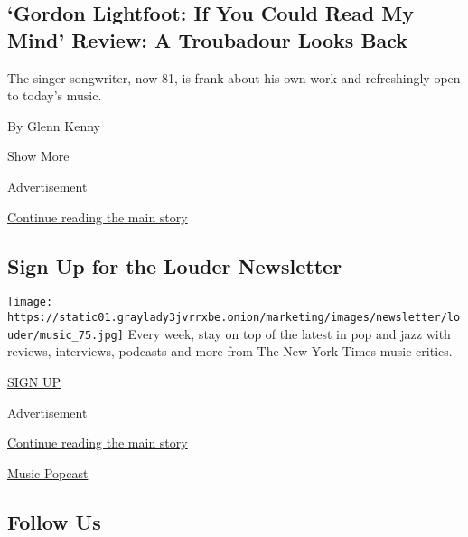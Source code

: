 \begin{enumerate}
  \hypertarget{gordon-lightfoot-if-you-could-read-my-mind-review-a-troubadour-looks-back}{%
  \subsection{`Gordon Lightfoot: If You Could Read My Mind' Review: A
  Troubadour Looks
  Back}\label{gordon-lightfoot-if-you-could-read-my-mind-review-a-troubadour-looks-back}}

  The singer-songwriter, now 81, is frank about his own work and
  refreshingly open to today's music.

  By Glenn Kenny
\end{enumerate}

Show More

Advertisement

\protect\hyperlink{after-mid2}{Continue reading the main story}

\hypertarget{sign-up-for-the-louder-newsletter}{%
\subsection{Sign Up for the Louder
Newsletter}\label{sign-up-for-the-louder-newsletter}}

\texttt{[image: https://static01.graylady3jvrrxbe.onion/marketing/images/newsletter/louder/music\_75.jpg]}
Every week, stay on top of the latest in pop and jazz with reviews,
interviews, podcasts and more from The New York Times music critics.

\href{/newsletters/signup/MS}{SIGN UP}

Advertisement

\protect\hyperlink{after-mktg}{Continue reading the main story}

\href{http://www.nytimes3xbfgragh.onion/column/popcast-pop-music-podcast}{Music
Popcast}

\hypertarget{follow-us}{%
\subsection{Follow Us}\label{follow-us}}

